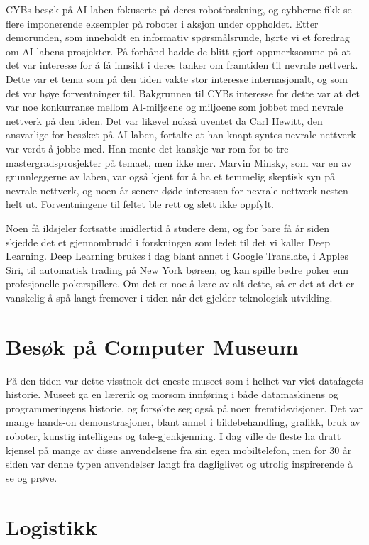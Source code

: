 CYBs besøk på AI-laben fokuserte på deres robotforskning, og cybberne fikk se flere imponerende eksempler på roboter i aksjon under oppholdet. Etter demorunden, som inneholdt en informativ spørsmålsrunde, hørte vi et foredrag om AI-labens prosjekter. På forhånd hadde de blitt gjort oppmerksomme på at det var interesse for å få innsikt i deres tanker om framtiden til nevrale nettverk. Dette var et tema som på den tiden vakte stor interesse internasjonalt, og som det var høye forventninger til. Bakgrunnen til CYBs interesse for dette var at det var noe konkurranse mellom AI-miljøene og miljøene som jobbet med nevrale nettverk på den tiden. Det var likevel nokså uventet da Carl Hewitt, den ansvarlige for besøket på AI-laben, fortalte at han knapt syntes nevrale nettverk var verdt å jobbe med. Han mente det kanskje var rom for to-tre mastergradsprosjekter på temaet, men ikke mer. Marvin Minsky, som var en av grunnleggerne av laben, var også kjent for å ha et temmelig skeptisk syn på nevrale nettverk, og noen år senere døde interessen for nevrale nettverk nesten helt ut. Forventningene til feltet ble rett og slett ikke oppfylt.

Noen få ildsjeler fortsatte imidlertid å studere dem, og for bare få år siden skjedde det et gjennombrudd i forskningen som ledet til det vi kaller Deep Learning. Deep Learning brukes i dag blant annet i Google Translate, i Apples Siri, til automatisk trading på New York børsen, og kan spille bedre poker enn profesjonelle pokerspillere. Om det er noe å lære av alt dette, så er det at det er vanskelig å spå langt fremover i tiden når det gjelder teknologisk utvikling.

\section{Besøk på Computer Museum}

På den tiden var dette visstnok det eneste museet som i helhet var viet datafagets historie. Museet ga en lærerik og morsom innføring i både datamaskinens og programmeringens historie, og forsøkte seg også på noen fremtidsvisjoner. Det var mange hands-on demonstrasjoner, blant annet i bildebehandling, grafikk, bruk av roboter, kunstig intelligens og tale-gjenkjenning. I dag ville de fleste ha dratt kjensel på mange av disse anvendelsene fra sin egen mobiltelefon, men for 30 år siden var denne typen anvendelser langt fra dagliglivet og utrolig inspirerende å se og prøve.

\section{Logistikk}

